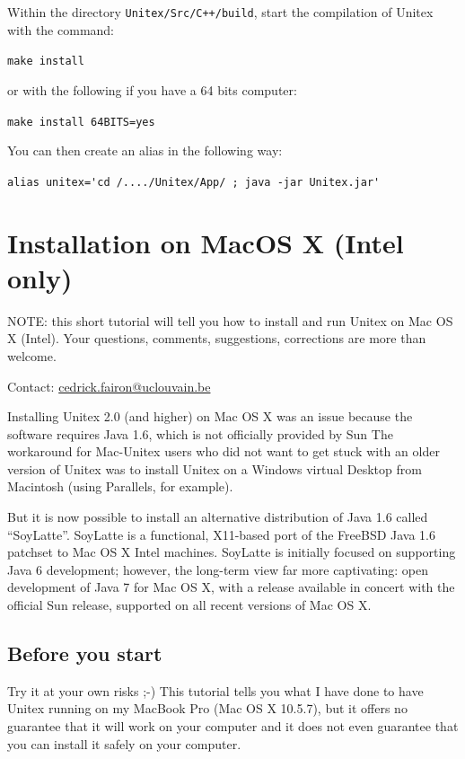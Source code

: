 \bigskip
\noindent Within the directory \verb|Unitex/Src/C++/build|, start the compilation
of Unitex with the command:

\bigskip \verb+make install+

\bigskip
\noindent or with the following if you have a 64 bits computer:
 
\bigskip \verb+make install 64BITS=yes+

\bigskip
\noindent You can then create an alias in the following way:

\bigskip \verb$alias unitex='cd /..../Unitex/App/ ; java -jar Unitex.jar'$


\section{Installation on MacOS X (Intel only)}
\label{section-macos-install}
\noindent NOTE: this short tutorial will tell you how to install and run 
Unitex on Mac OS X (Intel). Your questions, comments, suggestions, 
corrections are more than welcome. 

\noindent Contact: \url{cedrick.fairon@uclouvain.be}

\bigskip
\noindent Installing Unitex 2.0 (and higher) on Mac OS X was an issue because 
the software requires Java 1.6, which is not officially provided by Sun
The workaround for Mac-Unitex users who did not want to get stuck with an 
older version of Unitex was to install Unitex on a Windows virtual Desktop 
from Macintosh (using Parallels, for example).

\bigskip{}
\noindent But it is now possible to install an alternative distribution of Java
1.6 called ``SoyLatte''. SoyLatte is a functional, X11-based port of the FreeBSD
Java 1.6 patchset to Mac OS X Intel machines. SoyLatte is initially focused on 
supporting Java 6 development; however, the long-term view far more captivating: 
open development of Java 7 for Mac OS X, with a release available in concert 
with the official Sun release, supported on all recent versions of Mac OS X.


\subsection{Before you start}
\noindent Try it at your own risks ;-) This tutorial tells you what I have done
to have Unitex running on my MacBook Pro (Mac OS X 10.5.7), but it offers no guarantee 
that it will work  on your computer and it does not even guarantee that you can 
install it safely on your computer.

